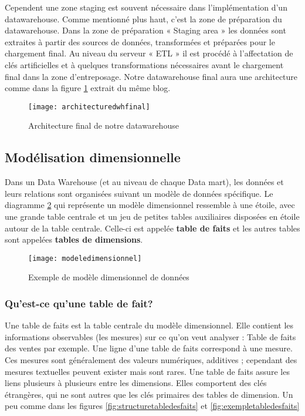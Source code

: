 Cependent une zone staging est souvent nécessaire dans l'implémentation d'un datawarehouse. Comme mentionné plus haut, c'est la zone de préparation du datawarehouse. Dans la zone de préparation « Staging area » les données sont extraites à partir des sources de données, transformées et préparées pour le chargement final. Au niveau du serveur « ETL » il est procédé à l’affectation de clés artificielles et à quelques transformations nécessaires avant le chargement final dans la zone d’entreposage. Notre datawarehouse final aura une architecture comme dans la figure \ref{fig:architecturedwhfinal} extrait du même blog.

\begin{figure}[H]
    \centering
    \texttt{[image: architecturedwhfinal]}
    \caption{Architecture final de notre datawarehouse}
    \label{fig:architecturedwhfinal}
\end{figure}

\subsection{Modélisation dimensionnelle}
Dans un Data Warehouse (et au niveau de chaque Data mart), les données et leurs relations sont organisées suivant un modèle de données spécifique. Le diagramme \ref{fig:modeledimensionnel} qui représente un modèle dimensionnel ressemble à une étoile, avec une grande table centrale et un jeu de petites tables auxiliaires disposées en étoile autour de la table centrale. Celle-ci est appelée \textbf{table de faits} et les autres tables sont appelées \textbf{tables de dimensions}.

\begin{figure}[H]
    \centering
    \texttt{[image: modeledimensionnel]}
    \caption{Exemple de modèle dimensionnel de données}
    \label{fig:modeledimensionnel}
\end{figure}

\subsubsection{Qu’est-ce qu’une table de fait?}
Une table de faits est la table centrale du modèle dimensionnel. Elle contient les informations observables (les mesures) sur ce qu’on veut analyser : Table de faits des ventes par exemple. Une ligne d’une table de faits correspond à une mesure. Ces mesures sont généralement des valeurs numériques, additives ; cependant des mesures textuelles peuvent exister mais sont rares. Une table de faits assure les liens plusieurs à plusieurs entre les dimensions. Elles comportent des clés étrangères, qui ne sont autres que les clés primaires des tables de dimension. Un peu comme dans les figures \ref{fig:structuretabledesfaits} et \ref{fig:exempletabledesfaits}

